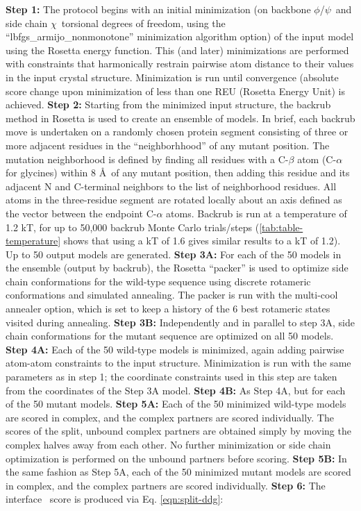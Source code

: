 \textbf{Step 1:} The protocol begins with an initial minimization (on backbone $\phi$/$\psi$\ and side chain $\chi$\ torsional degrees of freedom, using the ``lbfgs\_armijo\_nonmonotone'' minimization algorithm option) of the input model using the Rosetta energy function. This (and later) minimizations are performed with constraints that harmonically restrain pairwise atom distance to their values in the input crystal structure. Minimization is run until convergence (absolute score change upon minimization of less than one REU (Rosetta Energy Unit) is achieved.
\textbf{Step 2:} Starting from the minimized input structure, the backrub method in Rosetta\cite{smith_backrub-like_2008} is used to create an ensemble of models. In brief, each backrub move is undertaken on a randomly chosen protein segment consisting of three or more adjacent residues in the ``neighborhhood'' of any mutant position.
The mutation neighborhood is defined by finding all residues with a C-$\beta$ atom (C-$\alpha$ for glycines) within 8 \AA\ of any mutant position, then adding this residue and its adjacent N and C-terminal neighbors to the list of neighborhood residues.
All atoms in the three-residue segment are rotated locally about an axis defined as the vector between the endpoint C-$\alpha$ atoms. Backrub is run at a temperature of 1.2 kT, for up to 50,000 backrub Monte Carlo trials/steps (\cref{tab:table-temperature} shows that using a kT of 1.6 gives similar results to a kT of 1.2). Up to 50 output models are generated.
\textbf{Step 3A:} For each of the 50 models in the ensemble (output by backrub), the Rosetta ``packer'' is used to optimize side chain conformations for the wild-type sequence using discrete rotameric conformations \cite{shapovalov_smoothed_2011} and simulated annealing. The packer is run with the multi-cool annealer option\cite{leaver-fay_generic_2011}, which is set to keep a history of the 6 best rotameric states visited during annealing.
\textbf{Step 3B:} Independently and in parallel to step 3A, side chain conformations for the mutant sequence are optimized on all 50 models.
\textbf{Step 4A:} Each of the 50 wild-type models is minimized, again adding pairwise atom-atom constraints to the input structure. Minimization is run with the same parameters as in step 1; the coordinate constraints used in this step are taken from the coordinates of the Step 3A model.
\textbf{Step 4B:} As Step 4A, but for each of the 50 mutant models.
\textbf{Step 5A:} Each of the 50 minimized wild-type models are scored in complex, and the complex partners are scored individually. The scores of the split, unbound complex partners are obtained simply by moving the complex halves away from each other. No further minimization or side chain optimization is performed on the unbound partners before scoring.
\textbf{Step 5B:} In the same fashion as Step 5A, each of the 50 minimized mutant models are scored in complex, and the complex partners are scored individually.
\textbf{Step 6:} The interface \ddg\ score is produced via Eq. \ref{eqn:split-ddg}:

